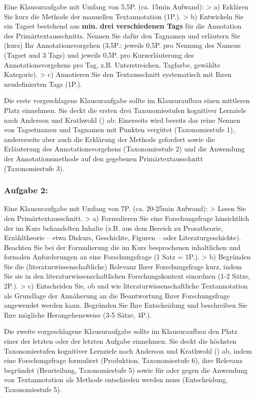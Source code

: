 \documentclass[
          a4paper,
        ]{article}
\begin{document}
Eine Klausuraufgabe mit Umfang von 5,5P. (ca. 15min Aufwand):
\textgreater{} a) Erklären Sie kurz die Methode der manuellen
Textannotation (1P.). \textgreater{} b) Entwickeln Sie ein Tagset
bestehend aus \textbf{min. drei verschiedenen Tags} für die Annotation
des Primärtextausschnitts. Nennen Sie dafür den Tagnamen und erläutern
Sie (kurz) Ihr Annotationsvorgehen (3,5P.: jeweils 0,5P. pro Nennung des
Namens (Tagset und 3 Tags) und jeweils 0,5P. pro Kurzerläuterung des
Annotationsvorgehens pro Tag, z.B. Unterstreichen, Tagfarbe, gewählte
Kategorie). \textgreater{} c) Annotieren Sie den Textausschnitt
systematisch mit Ihren neudefinierten Tags (1P.).

Die erste vorgeschlagene Klausuraufgabe sollte im Klausuraufbau einen
mittleren Platz einnehmen. Sie deckt die ersten drei Taxonomiestufen
kognitiver Lernziele nach Anderson und Krathwohl
() ab: Einerseits wird
bereits das reine Nennen von Tagsetnamen und Tagnamen mit Punkten
vergütet (Taxonomiestufe 1), andererseits aber auch die Erklärung der
Methode gefordert sowie die Erläuterung des Annotationsvorgehens
(Taxonomiestufe 2) und die Anwendung der Annotationsmethode auf den
gegebenen Primärtextausschnitt (Taxonomiestufe 3).

\subsubsection{Aufgabe 2:}\label{aufgabe-2}

Eine Klausuraufgabe mit Umfang von 7P. (ca. 20-25min Aufwand):
\textgreater{} Lesen Sie den Primärtextausschnitt. \textgreater{} a)
Formulieren Sie eine Forschungsfrage hinsichtlich der im Kurs
behandelten Inhalte (z.B. aus dem Bereich zu Prosatheorie, Erzähltheorie
-- etwa Diskurs, Geschichte, Figuren -- oder Literaturgeschichte).
Beachten Sie bei der Formulierung die im Kurs besprochenen inhaltlichen
und formalen Anforderungen an eine Forschungsfrage (1 Satz = 1P.).
\textgreater{} b) Begründen Sie die (literaturwissenschaftliche)
Relevanz Ihrer Forschungsfrage kurz, indem Sie sie in den
literaturwissenschaftlichen Forschungskontext einordnen (1-2 Sätze,
2P.). \textgreater{} c) Entscheiden Sie, ob und wie
literaturwissenschaftliche Textannotation als Grundlage der Annäherung
an die Beantwortung Ihrer Forschungsfrage angewendet werden kann.
Begründen Sie Ihre Entscheidung und beschreiben Sie Ihre mögliche
Herangehensweise (3-5 Sätze, 4P.).

Die zweite vorgeschlagene Klausuraufgabe sollte im Klausuraufbau den
Platz einer der letzten oder der letzten Aufgabe einnehmen. Sie deckt
die höchsten Taxonomiestufen kognitiver Lernziele nach Anderson und
Krathwohl () ab, indem eine
Forschungsfrage formuliert (Produktion, Taxonomiestufe 6), ihre Relevanz
begründet (Beurteilung, Taxonomiestufe 5) sowie für oder gegen die
Anwendung von Textannotation als Methode entschieden werden muss
(Entscheidung, Taxonomiestufe 5).
\end{document}
